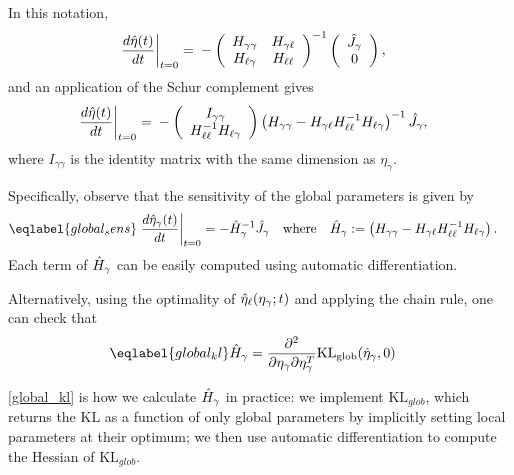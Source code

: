 In this notation,
%
\begin{align*}
%
\fracat{d \etaopt(\t)}{d \t}{t = 0} ={}&
-\left(
\begin{array}{cc}
   \hess{\gamma\gamma} & \hess{\gamma\ell} \\
   \hess{\ell\gamma}     & \hess{\ell\ell} \\
\end{array}
\right)^{-1}
\left( \begin{array}{c} \crosshessian_\gamma \\ 0 \end{array}\right),
%
\end{align*}
%
and an application of the Schur complement gives
%
\begin{align*}
%
\fracat{d \etaopt(\t)}{d \t}{t = 0} ={}&
-\left(\begin{array}{c}
I_{\gamma\gamma} \\
\hess{\ell\ell}^{-1} \hess{\ell\gamma}
\end{array}\right)
\left(\hess{\gamma\gamma} -
      \hess{\gamma\ell} \hess{\ell\ell}^{-1} \hess{\ell\gamma}\right)^{-1} \crosshessian_\gamma,
%
\end{align*}
where $I_{\gamma\gamma}$ is the identity matrix with
the same dimension as $\eta_\gamma$.

Specifically, observe that the sensitivity of the global parameters
is given by
\begin{align}\eqlabel{global_sens}
  \fracat{d \etaopt_\gamma(\t)}{d \t}{t = 0} &=
  - \hessopt_\gamma^{-1}\crosshessian_\gamma
  \mathwhere
  \hessopt_\gamma := \left(\hess{\gamma\gamma} -
        \hess{\gamma\ell} \hess{\ell\ell}^{-1} \hess{\ell\gamma}\right).
\end{align}
Each term of $\hat{H}_\gamma$ can be easily computed using automatic differentiation.

Alternatively, using the optimality of $\hat\eta_{\ell}(\eta_\gamma; t)$ and
applying the chain rule, one can check that
\begin{align}\eqlabel{global_kl}
\hessopt_{\gamma} &=
\frac{\partial^2}{\partial\eta_\gamma\partial\eta_\gamma^T}
\KLglobal(\etaopt_\gamma, 0)
\end{align}

\eqref{global_kl} is how we calculate $\hat{H}_\gamma$ in practice:
we implement $\mathrm{KL}_{glob}$, which returns the $\mathrm{KL}$ as a function of only global parameters
by implicitly setting local parameters at their optimum;
we then use automatic differentiation to
compute the Hessian of $\mathrm{KL}_{glob}$.

